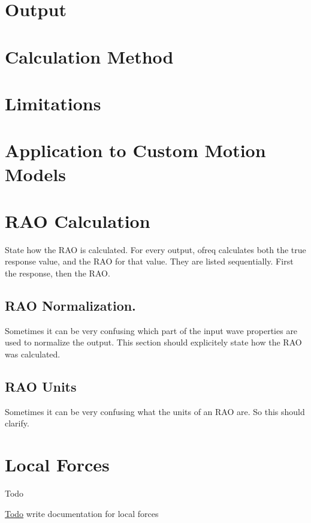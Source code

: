 \section*{Output}

\section*{Calculation Method}

\section*{Limitations}

\section*{Application to Custom Motion Models}

\section*{R\-A\-O Calculation}

State how the R\-A\-O is calculated. For every output, ofreq calculates both the true response value, and the R\-A\-O for that value. They are listed sequentially. First the response, then the R\-A\-O.

\subsection*{R\-A\-O Normalization.}

Sometimes it can be very confusing which part of the input wave properties are used to normalize the output. This section should explicitely state how the R\-A\-O was calculated.

\subsection*{R\-A\-O Units}

Sometimes it can be very confusing what the units of an R\-A\-O are. So this should clarify. \hypertarget{local_force}{}\section{Local Forces}\label{local_force}
\begin{DoxyRefDesc}{Todo}
\item[\hyperlink{todo__todo000025}{Todo}]write documentation for local forces\end{DoxyRefDesc}


